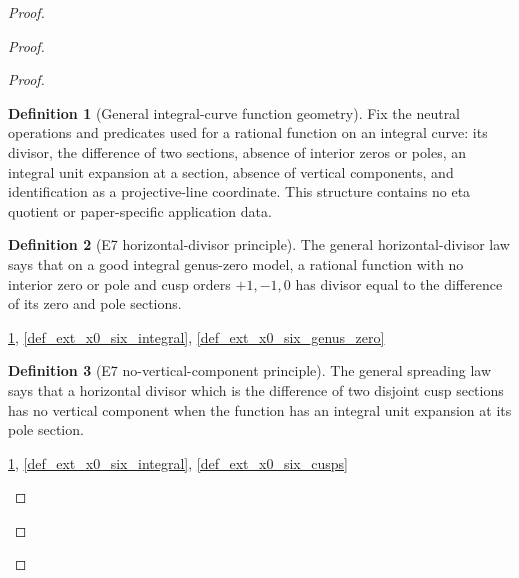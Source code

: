 \documentclass[11pt,a4paper]{article}
\numberwithin{equation}{section}
\theoremstyle{plain}\newtheorem{theorem}{Theorem}[section]\newaliascnt{proposition}{theorem}\newtheorem{proposition}[proposition]{Proposition}\aliascntresetthe{proposition}\newaliascnt{lemma}{theorem}\newtheorem{lemma}[lemma]{Lemma}\aliascntresetthe{lemma}
\theoremstyle{definition}\newaliascnt{definition}{theorem}\newtheorem{definition}[definition]{Definition}\aliascntresetthe{definition}\newaliascnt{notation}{theorem}\newtheorem{notation}[notation]{Notation}\aliascntresetthe{notation}
\providecommand{\lean}[1]{}\providecommand{\leanok}{}
\begin{document}
\begin{proof}
\begin{proof}
\begin{proof}
\begin{definition}[General integral-curve function geometry]\label{def_i15_integral_application}\lean{SptCM.RolenLiterature.IntegralCurveFunctionGeometry}\leanok
Fix the neutral operations and predicates used for a rational function on an
integral curve: its divisor, the difference of two sections, absence of
interior zeros or poles, an integral unit expansion at a section, absence of
vertical components, and identification as a projective-line coordinate.
This structure contains no eta quotient or paper-specific application data.
\end{definition}

\begin{definition}[E7 horizontal-divisor principle]\label{def_i15_horizontal_principle}\lean{SptCM.RolenLiterature.E7HorizontalDivisorPrinciple}\leanok
The general horizontal-divisor law says that on a good integral genus-zero
model, a rational function with no interior zero or pole and cusp orders
$+1,-1,0$ has divisor equal to the difference of its zero and pole sections.
\end{definition}
\begin{uses-statement}\ref{def_i15_integral_application}, \ref{def_ext_x0_six_integral}, \ref{def_ext_x0_six_genus_zero}\end{uses-statement}

\begin{definition}[E7 no-vertical-component principle]\label{def_i15_no_vertical_principle}\lean{SptCM.RolenLiterature.E7NoVerticalComponentPrinciple}\leanok
The general spreading law says that a horizontal divisor which is the
difference of two disjoint cusp sections has no vertical component when the
function has an integral unit expansion at its pole section.
\end{definition}
\begin{uses-statement}\ref{def_i15_integral_application}, \ref{def_ext_x0_six_integral}, \ref{def_ext_x0_six_cusps}\end{uses-statement}


\end{proof}
\end{proof}
\end{proof}
\end{document}
